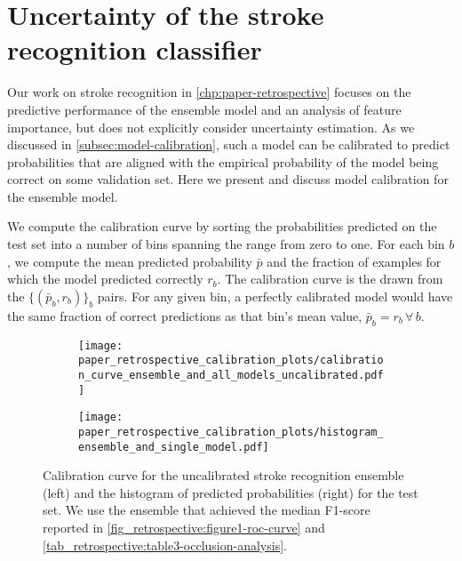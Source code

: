 \section{Uncertainty of the stroke recognition classifier} \label{sec: discussion-stroke-recognition-uncertainty}

Our work on stroke recognition in \cref{chp:paper-retrospective} focuses on the predictive performance of the ensemble model and an analysis of feature importance, but does not explicitly consider uncertainty estimation. 
As we discussed in \cref{subsec:model-calibration}, such a model can be calibrated to predict probabilities that are aligned with the empirical probability of the model being correct on some validation set. Here we present and discuss model calibration for the ensemble model. 

We compute the calibration curve by sorting the probabilities predicted on the test set into a number of bins spanning the range from zero to one. For each bin $b$, we compute the mean predicted probability $\bar{p}$ and the fraction of examples for which the model predicted correctly $r_{b}$. The calibration curve is the drawn from the $\{(\bar{p}_{b}, r_{b})\}_b$ pairs. For any given bin, a perfectly calibrated model would have the same fraction of correct predictions as that bin's mean value, $\bar{p}_{b} = r_{b}\,\forall\,b$. 

\begin{figure}
    \centering
    \begin{subfigure}[c]{0.49\columnwidth}
        \centering
        \texttt{[image: paper\_retrospective\_calibration\_plots/calibration\_curve\_ensemble\_and\_all\_models\_uncalibrated.pdf]}
    \end{subfigure}
    \hfill
    \begin{subfigure}[c]{0.49\columnwidth}
        \centering
        \texttt{[image: paper\_retrospective\_calibration\_plots/histogram\_ensemble\_and\_single\_model.pdf]}
    \end{subfigure}
    \caption[Calibration curve for the uncalibrated stroke recognition ensemble and empirical distribution of predicted probabilities.]{ Calibration curve for the uncalibrated stroke recognition ensemble (left) and the histogram of predicted probabilities (right) for the test set. We use the ensemble that achieved the median F1-score reported in \cref{fig_retrospective:figure1-roc-curve} and \cref{tab_retrospective:table3-occlusion-analysis}.}
    \label{fig_discussion:retrospective-paper-calibration-curve-of-uncalibrated-model}
\end{figure}

